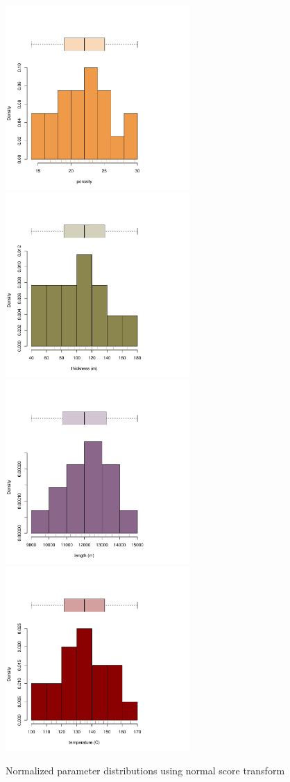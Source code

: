 \documentclass[review,authoryear, 12pt]{elsarticle}\usepackage[]{graphicx}\usepackage[]{color}
\newenvironment{knitrout}{}{} %
\begin{document}
\begin{knitrout}
\color{fgcolor}\begin{figure}[]

\includegraphics[width=7cm,height=7cm]{figure/normhistplots1} 
\includegraphics[width=7cm,height=7cm]{figure/normhistplots2} 
\includegraphics[width=7cm,height=7cm]{figure/normhistplots3} 
\includegraphics[width=7cm,height=7cm]{figure/normhistplots4} \caption[Normalized parameter distributions using normal score transform]{Normalized parameter distributions using normal score transform\label{Fig:normhistplots}}

\end{figure}
\end{knitrout}
\end{document}
